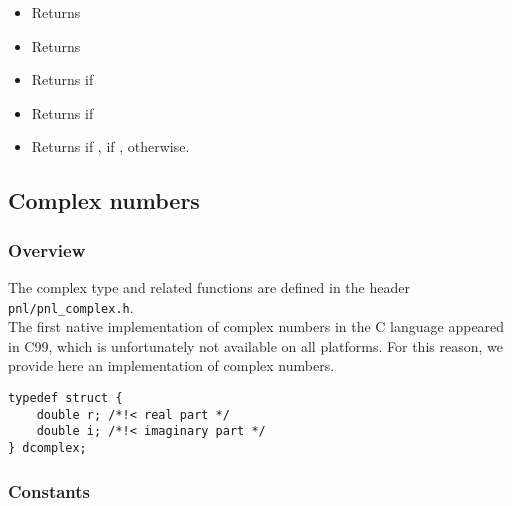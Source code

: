\begin{itemize}
\item {}
  \sshortdescribe Returns  

\item {}
  \sshortdescribe Returns  

\item {}
  \sshortdescribe Returns  if 

\item {}
  \sshortdescribe Returns  if 

\item {}
  \sshortdescribe Returns  if ,  if ,
   otherwise.
\end{itemize}



\subsection{Complex numbers}
\subsubsection{Overview}

The complex type and related functions are defined in the header
\verb!pnl/pnl_complex.h!.\\

The first native implementation of complex numbers in the C language appeared in
C99, which is unfortunately not available on all platforms. For this reason, we
provide here an implementation of complex numbers.

\begin{verbatim}
typedef struct {
    double r; /*!< real part */
    double i; /*!< imaginary part */
} dcomplex;
\end{verbatim}


\subsubsection{Constants}

\begin{describeconst}
\end{describeconst}

